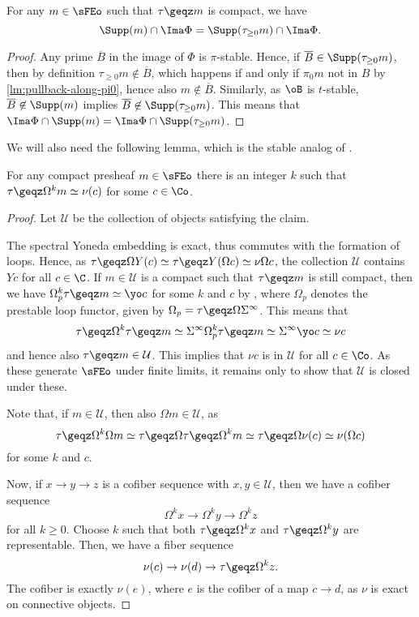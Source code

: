 \begin{lemma}
    \label{lm:support-of-connected-cover}
    For any $m\in \sFEo$ such that $\tau\geqz m$ is compact, we have
    \[\Supp(m)\cap \Ima\Phi = \Supp(\tau_{\geq 0}m)\cap \Ima\Phi.\]
\end{lemma}
\begin{proof}
    Any prime $\overline B$ in the image of $\Phi$ is $\pi$-stable. Hence, if $\overline B \in \Supp(\tau_{\geq 0}m)$, then by definition $\tau_{\geq 0}m \not\in \overline B$, which happens if and only if $\pi_0 m$ not in $B$ by \cref{lm:pullback-along-pi0}, hence also $m\not \in \overline B$. Similarly, as $\oB$ is $t$-stable, $\overline B \not \in \Supp(m)$ implies $\overline B \not \in \Supp(\tau_{\geq 0}m)$. This means that $\Ima\Phi \cap \Supp(m) = \Ima\Phi \cap \Supp(\tau_{\geq 0}m)$. 
\end{proof}

We will also need the following lemma, which is the stable analog of \cite[4.25]{patchkoria-pstragowski_2021}. 

\begin{lemma}
    \label{lm:compacts-are-loop-representable}
    For any compact presheaf $m\in \sFEo$ there is an integer $k$ such that $\tau\geqz\Omega^{k} m \simeq \nu(c)$ for some $c\in \Co$.
\end{lemma}
\begin{proof}
    Let $\mathcal{U}$ be the collection of objects satisfying the claim. 
    
    The spectral Yoneda embedding is exact, thus commutes with the formation of loops. Hence, as $\tau\geqz \Omega Y(c) \simeq \tau\geqz Y(\Omega c) \simeq \nu \Omega c$, the collection $\mathcal{U}$ contains $Yc$ for all $c\in \C$. If $m\in \mathcal{U}$ is a compact such that $\tau\geqz m$ is still compact, then we have $\Omega^k_p\tau\geqz m \simeq \yo c$ for some $k$ and $c$ by \cite[4.25]{patchkoria-pstragowski_2021}, where $\Omega_p$ denotes the prestable loop functor, given by $\Omega_p = \tau\geqz \Omega \Sigma^\infty$. This means that 
    \[\tau\geqz \Omega^k \tau\geqz m \simeq \Sigma^\infty\Omega^k_p\tau\geqz m \simeq \Sigma^\infty\yo c \simeq \nu c\]
    and hence also $\tau\geqz m \in \mathcal{U}$. This implies that $\nu c$ is in $\mathcal{U}$ for all $c\in \Co$. As these generate $\sFEo$ under finite limits, it remains only to show that $\mathcal{U}$ is closed under these. 

    Note that, if $m\in \mathcal{U}$, then also $\Omega m\in \mathcal{U}$, as 
    \[\tau\geqz \Omega^k \Omega m \simeq \tau\geqz \Omega \tau\geqz \Omega^k m \simeq \tau\geqz\Omega \nu(c) \simeq \nu(\Omega c)\]
    for some $k$ and $c$. 

    Now, if $x\rightarrow y\rightarrow z$ is a cofiber sequence with $x, y\in \mathcal{U}$, then we have a cofiber sequence 
    \[\Omega^k x \to  \Omega^k y\to \Omega^k z\]
    for all $k\geq 0$. Choose $k$ such that both $\tau\geqz\Omega^k x$ and $\tau\geqz\Omega^k y$ are representable. Then, we have a fiber sequence 
    \[\nu (c)\to \nu (d)\to \tau\geqz\Omega^k z.\]
    The cofiber is exactly $\nu (e)$, where $e$ is the cofiber of a map $c \to d$, as $\nu$ is exact on connective objects. 
\end{proof}

